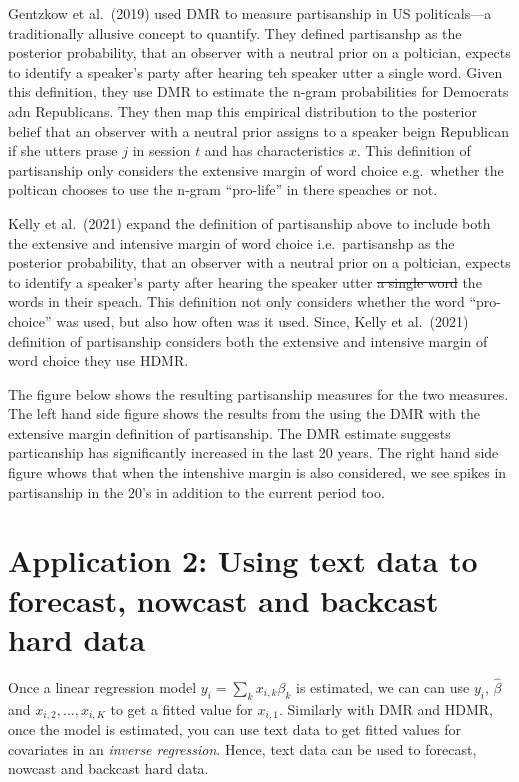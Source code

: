 \documentclass[
]{book}
\begin{document}
Gentzkow et al.~(2019) used DMR to measure partisanship in US politicals---a traditionally allusive concept to quantify. They defined partisanshp as the posterior probability, that an observer with a neutral prior on a poltician, expects to identify a speaker's party after hearing teh speaker utter a single word. Given this definition, they use DMR to estimate the n-gram probabilities for Democrats adn Republicans. They then map this empirical distribution to the posterior belief that an observer with a neutral prior assigns to a speaker beign Republican if she utters prase \(j\) in session \(t\) and has characteristics \(x\). This definition of partisanship only considers the extensive margin of word choice e.g.~whether the poltican chooses to use the n-gram ``pro-life'' in there speaches or not.

Kelly et al.~(2021) expand the definition of partisanship above to include both the extensive and intensive margin of word choice i.e.~partisanshp as the posterior probability, that an observer with a neutral prior on a poltician, expects to identify a speaker's party after hearing the speaker utter \sout{a single word} the words in their speach. This definition not only considers whether the word ``pro-choice'' was used, but also how often was it used. Since, Kelly et al.~(2021) definition of partisanship considers both the extensive and intensive margin of word choice they use HDMR.

The figure below shows the resulting partisanship measures for the two measures. The left hand side figure shows the results from the using the DMR with the extensive margin definition of partisanship. The DMR estimate suggests particanship has significantly increased in the last 20 years. The right hand side figure whows that when the intenshive margin is also considered, we see spikes in partisanship in the 20's in addition to the current period too.

\hypertarget{application-2-using-text-data-to-forecast-nowcast-and-backcast-hard-data}{%
\section{Application 2: Using text data to forecast, nowcast and backcast hard data}\label{application-2-using-text-data-to-forecast-nowcast-and-backcast-hard-data}}

Once a linear regression model \(y_i = \sum_{k} x_{i,k}\beta_k\) is estimated, we can can use \(y_i\), \(\hat \beta\) and \(x_{i,2},\dots, x_{i,K}\) to get a fitted value for \(x_{i,1}\). Similarly with DMR and HDMR, once the model is estimated, you can use text data to get fitted values for covariates in an \emph{inverse regression}. Hence, text data can be used to forecast, nowcast and backcast hard data.
\end{document}
